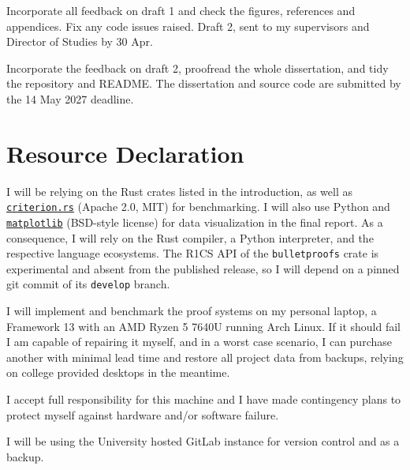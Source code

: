 \documentclass[11pt,a4paper]{article}
\begin{document}
{Incorporate all feedback on draft 1 and check the figures, references and appendices. Fix any code issues raised.}
{Draft 2, sent to my supervisors and Director of Studies by 30 Apr.}

{Incorporate the feedback on draft 2, proofread the whole dissertation, and tidy the repository and README.}
{The dissertation and source code are submitted by the 14 May 2027 deadline.}
\section{Resource Declaration}

I will be relying on the Rust crates listed in the introduction, as well as \href{https://github.com/bheisler/criterion.rs}{\texttt{criterion.rs}} (Apache 2.0, MIT) for benchmarking. I will also use Python and \href{https://github.com/matplotlib/matplotlib}{\texttt{matplotlib}} (BSD-style license) for data visualization in the final report. As a consequence, I will rely on the Rust compiler, a Python interpreter, and the respective language ecosystems. The R1CS API of the \texttt{bulletproofs} crate is experimental and absent from the published release, so I will depend on a pinned git commit of its \texttt{develop} branch.

I will implement and benchmark the proof systems on my personal laptop, a Framework 13 with an AMD Ryzen 5 7640U running Arch Linux. If it should fail I am capable of repairing it myself, and in a worst case scenario, I can purchase another with minimal lead time and restore all project data from backups, relying on college provided desktops in the meantime.

I accept full responsibility for this machine and I have made contingency plans to protect myself against hardware and/or software failure.

I will be using the University hosted GitLab instance for version control and as a backup.
\end{document}
